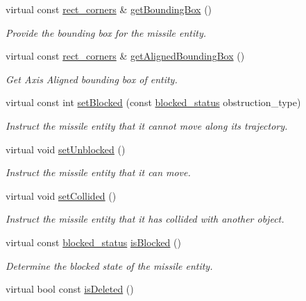 \begin{DoxyCompactItemize}
virtual const \hyperlink{structrect__corners}{rect\-\_\-corners} \& \hyperlink{classMissile_a6f9a14b7e2a2041fbccb566bf2a3b469}{get\-Bounding\-Box} ()
\begin{DoxyCompactList}\small\item\em Provide the bounding box for the missile entity. \end{DoxyCompactList}\item 
virtual const \hyperlink{structrect__corners}{rect\-\_\-corners} \& \hyperlink{classMissile_af2a9b1f8503cc2d322f5ab6ea788d393}{get\-Aligned\-Bounding\-Box} ()
\begin{DoxyCompactList}\small\item\em Get Axis Aligned bounding box of entity. \end{DoxyCompactList}\item 
virtual const int \hyperlink{classMissile_a4f6e73f8d9f9723a777875efcb9edfa7}{set\-Blocked} (const \hyperlink{Structures_8h_a6fef29d9424addfa69bdd2a379424896}{blocked\-\_\-status} obstruction\-\_\-type)
\begin{DoxyCompactList}\small\item\em Instruct the missile entity that it cannot move along its trajectory. \end{DoxyCompactList}\item 
virtual void \hyperlink{classMissile_af66d762c4401061f64bcf9b46343c967}{set\-Unblocked} ()
\begin{DoxyCompactList}\small\item\em Instruct the missile entity that it can move. \end{DoxyCompactList}\item 
virtual void \hyperlink{classMissile_a1a27cc48265f34e3298c780c37ca8a0e}{set\-Collided} ()
\begin{DoxyCompactList}\small\item\em Instruct the missile entity that it has collided with another object. \end{DoxyCompactList}\item 
virtual const \hyperlink{Structures_8h_a6fef29d9424addfa69bdd2a379424896}{blocked\-\_\-status} \hyperlink{classMissile_a2c86874bf5e6bde8cb97f4ed1a07c3ea}{is\-Blocked} ()
\begin{DoxyCompactList}\small\item\em Determine the blocked state of the missile entity. \end{DoxyCompactList}\item 
virtual bool const \hyperlink{classMissile_a96c1240f08fed605ff9e908a0bea50e4}{is\-Deleted} ()

\end{DoxyCompactItemize}
